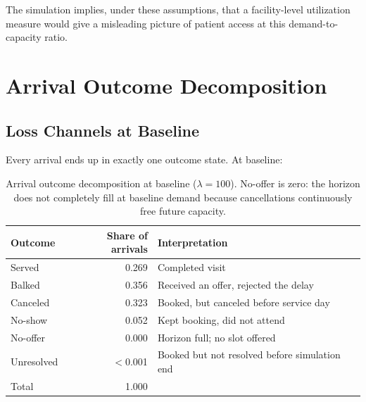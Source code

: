 \documentclass[11pt]{article}
\begin{document}
The simulation implies, under these assumptions, that a facility-level
utilization measure would give a misleading picture of patient access at
this demand-to-capacity ratio.

\section{Arrival Outcome Decomposition}
\label{sec:decomp}

\subsection{Loss Channels at Baseline}

Every arrival ends up in exactly one outcome state. At baseline:

\begin{table}[H]
\centering
\renewcommand{\arraystretch}{1.12}
\begin{tabular}{lrp{}}
\toprule
Outcome & Share of arrivals & Interpretation \\
\midrule
Served & 0.269 & Completed visit \\
Balked & 0.356 & Received an offer, rejected the delay \\
Canceled & 0.323 & Booked, but canceled before service day \\
No-show & 0.052 & Kept booking, did not attend \\
No-offer & 0.000 & Horizon full; no slot offered \\
Unresolved & $<$0.001 & Booked but not resolved before simulation end \\
\midrule
Total & 1.000 & \\
\bottomrule
\end{tabular}
\caption{Arrival outcome decomposition at baseline ($\lambda = 100$).
No-offer is zero: the horizon does not completely fill at baseline demand
because cancellations continuously free future capacity.}
\label{tab:decomp}
\end{table}
\end{document}
